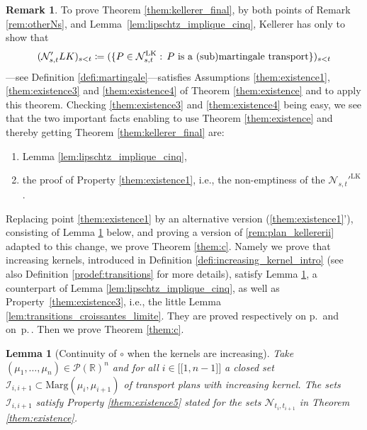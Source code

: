 \documentclass[11pt]{article}
\newcommand{\ie}{i.e.,\xspace}
\renewcommand{\theenumi}{\alph{enumi}}
\renewcommand{\theenumii}{\roman{enumii}}
\newenvironment{enumeratei}
{\bgroup\def\theenumi{\roman{enumi}}\def\theenumii{\arabic{enumii}}\begin{enumerate}}
{\end{enumerate}\egroup}
\newcommand{\llbracket}{\mathopen{[\!\![}}
\newcommand{\rrbracket}{\mathclose{]\!\!]}}
\theoremstyle{plain}
\newtheorem{lem}[them]{Lemma}
\theoremstyle{definition}
\newtheorem{rem}[them]{Remark}
\newcommand{\ML}{\mathrm{LK}}
\newcommand{\eqdefup}{\coloneqq}
\newcommand{\p}{\mathcal{P}}
\newcommand{\ma}{\mathrm{Marg}}
\newcommand{\R}{\mathbb{R}}
\begin{document}
\begin{rem}\label{rem:plan_kellerer}To prove Theorem \ref{them:kellerer_final}, by both points of Remark \ref{rem:otherNs},
and Lem\-ma~\ref{lem:lipschtz_implique_cinq}, Kellerer has only to show that
\[
(\mathcal{N}_{s,t}'^\ML)_{s<t}\eqdefup(\{P\in\mathcal{N}_{s,t}^\ML :\,P\text{ is a (sub)mar\-tin\-gale transport}\})_{s<t}
\]
---see Definition \ref{defi:martingale}---satisfies Assumptions \eqref{them:existence1}, \eqref{them:existence3} and \eqref{them:existence4} of Theorem \ref{them:existence} and to apply this theorem. Checking \eqref{them:existence3} and \eqref{them:existence4} being easy, we see that the two important facts enabling to use Theorem \ref{them:existence} and thereby getting Theorem \ref{them:kellerer_final} are:

\begin{enumeratei}
\item\label{rem:plan_kellereri}
Lemma \ref{lem:lipschtz_implique_cinq},

\item\label{rem:plan_kellererii}
the proof of Property \eqref{them:existence1}, \ie the non-emptiness of the $\mathcal{N}_{s,t}'^\ML$.
\end{enumeratei}
\end{rem}

Replacing point \eqref{them:existence1} by an alternative version (\ref{them:existence1}'), consisting of Lemma \ref{lem:closed} below, and proving a version of \eqref{rem:plan_kellererii} adapted to this change, we prove Theorem \ref{them:c}. Namely we prove that increasing kernels, introduced in Definition \ref{defi:increasing_kernel_intro} (see also Definition \ref{prodef:transitions} for more details), satisfy Lemma \ref{lem:closed}, a counterpart of Lemma \ref{lem:lipschtz_implique_cinq}, as well as Property~\eqref{them:existence3}, \ie the little Lemma \ref{lem:transitions_croissantes_limite}. They are proved respectively on p.\,\pageref{proof:lem:closed} and on~p.\,\pageref{proof:lem:transitions_croissantes_limite}. Then we prove Theorem \ref{them:c}.

\begin{lem}[Continuity of $\circ$ when the kernels are increasing]\label{lem:closed}Take $
(\mu_1,\ldots,\mu_n)\in\p(\R)^n$ and for all $i\in\llbracket1,n-1\rrbracket$ a closed set $\mathcal{I}_{i,i+1}\subset\ma(\mu_i,\mu_{i+1})$ of transport plans with increasing kernel. The sets $\mathcal{I}_{i,i+1}$ satisfy Property \eqref{them:existence5} stated for the sets $\mathcal{N}_{t_i,t_{i+1}}$ in Theorem \ref{them:existence}.
\end{lem}
\end{document}
